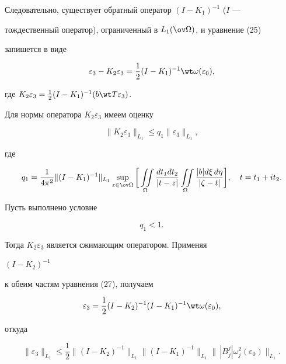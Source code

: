 Следовательно, существует обратный оператор $(I-K_1)^{-1}$ ($I$ --- 


тождественный оператор), ограниченный в $L_1(\ov\Omega)$, и уравнение (25) 


запишется в виде 


\begin{equation} 


\varepsilon_3-K_2\varepsilon_3=\frac{1}{2} 


(I-K_1)^{-1}\wt\omega(\varepsilon_0), 


\end{equation} 


где $K_2\varepsilon_3=\frac{1}{2}(I-K_1)^{-1}(b\wt T\varepsilon_3)$. 


Для нормы оператора $K_2\varepsilon_3$ имеем оценку 


$$ 


\|K_2\varepsilon_3\|_{L_1}\le q_1\|\varepsilon_3\|_{L_1}, 


$$ 


где 


$$ 


q_1=\frac{1}{4\pi^2}\|(I-K_1)^{-1}\|_{L_1} 


\sup_{z\in\ov\Omega}\bigg[\iint\limits_\Omega 


\frac{d t_1d t_2}{|t-z|}\iint\limits_\Omega 


\frac{|b|d\xi\,d\eta}{|\zeta-t|}\bigg],\quad 


t=t_1+it_2. 


$$ 


 


Пусть выполнено условие 


\begin{equation} 


q_1<1. 


\end{equation} 


Тогда $K_2\varepsilon_3$ является сжимающим оператором. Применяя 


$(I-K_2)^{-1}$ 


к обеим частям уравнения (27), получаем 


$$ 


\varepsilon_3=\frac{1}{2}(I-K_2)^{-1}(I-K_1)^{-1} 


\wt\omega(\varepsilon_0), 


$$ 


откуда 


\begin{equation} 


\|\varepsilon_3\|_{L_1}\le\frac{1}{2} 


\|(I-K_2)^{-1}\|_{L_1}\|(I-K_1)^{-1}\|_{L_1} 


\|\,|B^j_j|\omega^2_j(\varepsilon_0)\|_{L_1}. 


\end{equation} 


